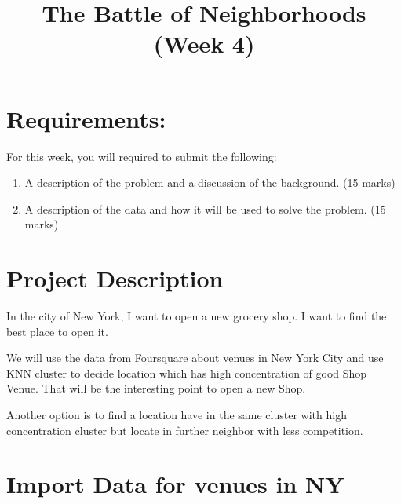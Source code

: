 \documentclass[11pt]{article}
\title{The Battle of Neighborhoods (Week 4)}
\providecommand{\tightlist}{%
      \setlength{\itemsep}{0pt}\setlength{\parskip}{0pt}}
\begin{document}
    
    \maketitle
    
    

    
    \hypertarget{requirements}{%
\section{Requirements:}\label{requirements}}

For this week, you will required to submit the following:

\begin{enumerate}
\def\labelenumi{\arabic{enumi}.}
\tightlist
\item
  A description of the problem and a discussion of the background. (15
  marks)
\item
  A description of the data and how it will be used to solve the
  problem. (15 marks)
\end{enumerate}

    \hypertarget{project-description}{%
\section{Project Description}\label{project-description}}

    In the city of New York, I want to open a new grocery shop. I want to
find the best place to open it.

We will use the data from Foursquare about venues in New York City and
use KNN cluster to decide location which has high concentration of good
Shop Venue. That will be the interesting point to open a new Shop.

Another option is to find a location have in the same cluster with high
concentration cluster but locate in further neighbor with less
competition.

    \hypertarget{import-data-for-venues-in-ny}{%
\section{Import Data for venues in
NY}\label{import-data-for-venues-in-ny}}
\end{document}
